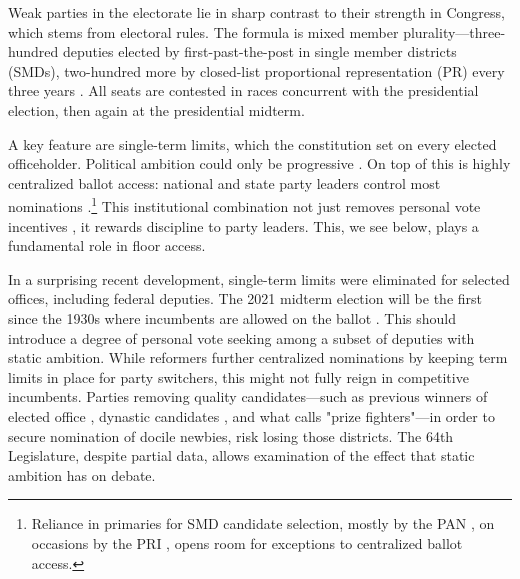 \documentclass[letter,12pt]{article}
\begin{document}


Weak parties in the electorate lie in sharp contrast to their strength in Congress, which stems from electoral rules. The formula is mixed member plurality---three-hundred deputies elected by first-past-the-post in single member districts (SMDs), two-hundred more by closed-list proportional representation (PR) every three years \citep{weldonMixedMemberSys2001}. All seats are contested in races concurrent with the presidential election, then again at the presidential midterm.

A key feature are single-term limits, which the constitution set on every elected officeholder. Political ambition could only be progressive \citep{schlesinger.1966}. On top of this is highly centralized ballot access: national and state party leaders control most nominations \citep{rosas.langston.2011,langston.2008}.\footnote{Reliance in primaries for SMD candidate selection, mostly by the PAN \citep{ascencio.kerevel.cand-sel-beh.2021}, on occasions by the PRI \citep{poire.phd.2002}, opens room for exceptions to centralized ballot access.} This institutional combination not just removes personal vote incentives \citep{carey.shugart.1995}, it rewards discipline to party leaders. This, we see below, plays a fundamental role in floor access. 

In a surprising recent development, single-term limits were eliminated for selected offices, including federal deputies. The 2021 midterm election will be the first since the 1930s where incumbents are allowed on the ballot \citep[see][ for details]{magarInstReel.2017}. This should introduce a degree of personal vote seeking among a subset of deputies with static ambition. While reformers further centralized nominations by keeping term limits in place for party switchers, this might not fully reign in competitive incumbents. Parties removing quality candidates---such as previous winners of elected office \citep{jacobson.1997}, dynastic candidates \citep{enriquez-dinastias2018itam}, and what \citet{zallerprizeFighters} calls "prize fighters"---in order to secure nomination of docile newbies, risk losing those districts. The 64th Legislature, despite partial data, allows examination of the effect that static ambition has on debate.
\end{document}
